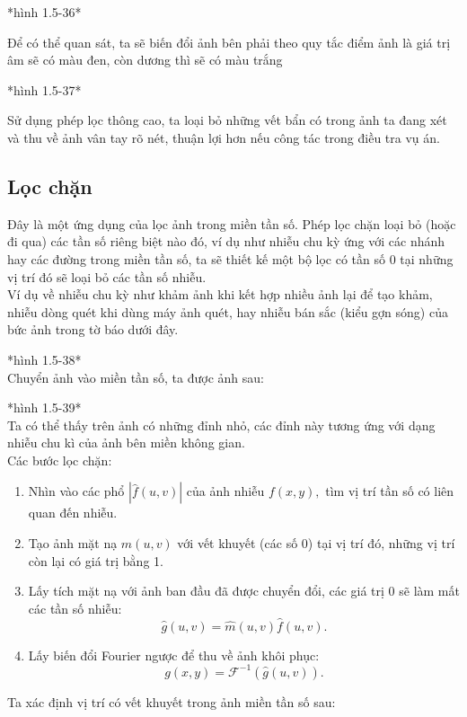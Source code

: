 \documentclass[12pt,a4paper]{report}
\numberwithin{equation}{section}
\theoremstyle{definition} %
\begin{document}
*hình 1.5-36*

Để có thể quan sát, ta sẽ biến đổi ảnh bên phải theo quy tắc điểm ảnh là giá trị âm sẽ có màu đen, còn dương thì sẽ có màu trắng

*hình 1.5-37*

Sử dụng phép lọc thông cao, ta loại bỏ những vết bẩn có trong ảnh ta đang xét và thu về ảnh vân tay rõ nét, thuận lợi hơn nếu công tác trong điều tra vụ án.
\subsection{Lọc chặn}
Đây là một ứng dụng của lọc ảnh trong miền tần số. Phép lọc chặn loại bỏ (hoặc đi qua) các tần số riêng biệt nào đó, ví dụ như nhiễu chu kỳ ứng với các nhánh hay các đường trong miền tần số, ta sẽ thiết kế một bộ lọc có tần số 0 tại những vị trí đó sẽ loại bỏ các tần số nhiễu.\\

Ví dụ về nhiễu chu kỳ như khảm ảnh khi kết hợp nhiều ảnh lại để tạo khảm, nhiễu dòng quét khi dùng máy ảnh quét, hay nhiễu bán sắc (kiểu gợn sóng) của bức ảnh trong tờ báo dưới đây.

*hình 1.5-38*\\

Chuyển ảnh vào miền tần số, ta được ảnh sau:

*hình 1.5-39*
\\

Ta có thể thấy trên ảnh có những đỉnh nhỏ, các đỉnh này tương ứng với dạng nhiễu chu kì của ảnh bên miền không gian.\\

Các bước lọc chặn:
\begin{enumerate}
    \item Nhìn vào các phổ $|\hat{f}(u,v)|$ của ảnh nhiễu $f(x,y),$ tìm vị trí tần số có liên quan đến nhiễu.
    \item Tạo ảnh mặt nạ $\widehat{m}(u,v)$ với vết khuyết (các số 0) tại vị trí đó, những vị trí còn lại có giá trị bằng 1.
    \item Lấy tích mặt nạ với ảnh ban đầu đã được chuyển đổi, các giá trị 0 sẽ làm mất các tần số nhiễu:
    $$\hat{g}(u,v)=\widehat{m}(u,v)\hat{f}(u,v).$$
    \item Lấy biến đổi Fourier ngược để thu về ảnh khôi phục:
    $$g(x,y)=\mathcal{F}^{-1}\left(\hat{g}(u,v)\right).$$

   
    
\end{enumerate}
 Ta xác định vị trí có vết khuyết trong ảnh miền tần số sau:
\end{document}
